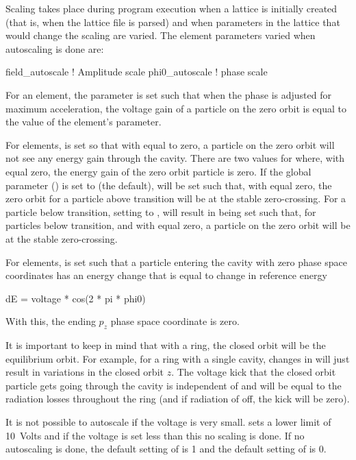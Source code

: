 Scaling takes place during program execution when a lattice is initially created (that is,
when the lattice file is parsed) and when parameters in the lattice that would change the
scaling are varied.  The element parameters varied when autoscaling is done are:
\begin{example}
  field_autoscale       ! Amplitude scale
  phi0_autoscale        ! phase scale
\end{example}
For an  element, the  parameter is set such that when the phase is
adjusted for maximum acceleration, the voltage gain of a particle on the zero orbit is equal to the
value of the element's  parameter. 

For  elements,  is set so that with  equal to zero, a
particle on the zero orbit will not see any energy gain through the cavity. There are two values for
 where, with  equal zero, the energy gain of the zero orbit particle is
zero. If the  global parameter 
() is set to  (the default),  will be set such
that, with  equal zero, the zero orbit for a particle above transition will be at the
stable zero-crossing. For a particle below transition, setting  to
, will result in  being set such that, for particles below transition,
and with  equal zero, a particle on the zero orbit will be at the stable zero-crossing.

For  elements,  is set such that a particle entering the cavity with
zero phase space coordinates has an energy change that is equal to change in reference energy
\begin{example}
  dE = voltage * cos(2 * pi * phi0)
\end{example}
With this, the ending $p_z$ phase space coordinate is zero.

It is important to keep in mind that with a ring, the closed orbit will be the equilibrium
orbit. For example, for a ring with a single cavity, changes in  will just result in
variations in the closed orbit $z$. The voltage kick that the closed orbit particle gets going
through the cavity is independent of  and will be equal to the radiation losses throughout
the ring (and if radiation of off, the kick will be zero).

It is not possible to autoscale if the voltage is very small. \bmad sets a lower limit of 10~Volts
and if the voltage is set less than this no scaling is done. If no autoscaling is done, the default
setting of  is 1 and the default setting of  is 0.

